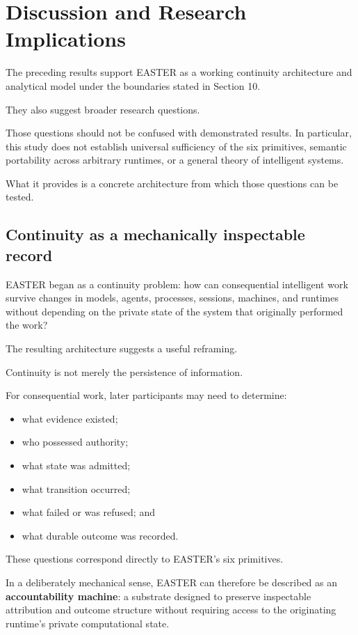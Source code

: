 \documentclass[11pt]{article}
\begin{document}
\section{Discussion and Research Implications}

The preceding results support EASTER as a working continuity architecture and analytical model under the boundaries stated in Section 10.

They also suggest broader research questions.

Those questions should not be confused with demonstrated results. In particular, this study does not establish universal sufficiency of the six primitives, semantic portability across arbitrary runtimes, or a general theory of intelligent systems.

What it provides is a concrete architecture from which those questions can be tested.

\subsection{Continuity as a mechanically inspectable record}

EASTER began as a continuity problem: how can consequential intelligent work survive changes in models, agents, processes, sessions, machines, and runtimes without depending on the private state of the system that originally performed the work?

The resulting architecture suggests a useful reframing.

Continuity is not merely the persistence of information.

For consequential work, later participants may need to determine:

\begin{itemize}
\item what evidence existed;
\item who possessed authority;
\item what state was admitted;
\item what transition occurred;
\item what failed or was refused; and
\item what durable outcome was recorded.
\end{itemize}

These questions correspond directly to EASTER's six primitives.

In a deliberately mechanical sense, EASTER can therefore be described as an \textbf{accountability machine}: a substrate designed to preserve inspectable attribution and outcome structure without requiring access to the originating runtime's private computational state.
\end{document}
